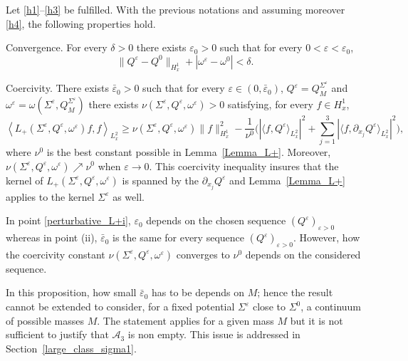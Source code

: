 \begin{proposition}\label{perturbative_L+}
Let \eqref{h1}--\eqref{h3} be fulfilled. With the previous notations and assuming moreover \eqref{h4}, the following properties hold.
\begin{enumeratei}
\item\label{perturbative_L+i}
\textup{Convergence.} For every $\delta>0$ there exists $\varepsilon_{0}>0$ such that for every $0<\varepsilon<\varepsilon_{0}$,
\[
\|Q^{\varepsilon}-Q^{0}\|_{H_{x}^{1}}+|\omega^{\varepsilon}-\omega^{0}|<\delta.
\]
\item\label{perturbative_L+ii}
\textup{Coercivity.} There exists $\bar{\varepsilon}_0>0$ such that for every $\varepsilon\in(0,\bar{\varepsilon}_{0})$, $Q^{\varepsilon}=Q_{M}^{\Sigma^{\varepsilon}}$ and $\omega^{\varepsilon}=\omega(\Sigma^{\varepsilon},Q_{M}^{\Sigma^{\varepsilon}})$ there exists $\nu(\Sigma^{\varepsilon},Q^{\varepsilon},\omega^{\varepsilon})>0$ satisfying, for every $f\in H_{x}^{1}$,
\[
\left\langle L_{+}(\Sigma^{\varepsilon},Q^{\varepsilon},\omega^{\varepsilon})f,f\right\rangle_{L_{x}^{2}}\!\geq\!
\nu(\Sigma^{\varepsilon},Q^{\varepsilon},\omega^{\varepsilon})\|f\|_{H_{x}^{1}}^{2}-\frac{1}{\nu^{0}}\biggl(\!\left|\langle f,Q^{\varepsilon}\rangle_{L_{x}^{2}}\right|^{2}+\sum_{j=1}^{3}\left|\langle f,\partial_{x_{j}}Q^{\varepsilon}\rangle_{L_{x}^{2}}\right|^{2}\!\biggr),
\]
where $\nu^{0}$ is the best constant possible in Lemma~\ref{Lemma_L+}. Moreover, $\nu(\Sigma^{\varepsilon},Q^{\varepsilon},\omega^{\varepsilon})\nearrow\nu^{0}$ when $\varepsilon\to 0$. This coercivity inequality insures that the kernel of $L_{+}(\Sigma^{\varepsilon},Q^{\varepsilon},\omega^{\varepsilon})$ is spanned by the $\partial_{x_{j}}Q^{\varepsilon}$ and Lemma~\ref{Lemma_L+} applies to the kernel $\Sigma^\varepsilon$ as well.
\end{enumeratei}
\end{proposition}

\begin{rmk}
In point \eqref{perturbative_L+i}, $\varepsilon_{0}$ depends on the chosen sequence $(Q^{\varepsilon})_{\varepsilon>0}$ whereas in point (ii), $\bar{\varepsilon}_{0}$ is the same for every sequence $(Q^{\varepsilon})_{\varepsilon>0}$. However, how the coercivity constant $\nu(\Sigma^{\varepsilon},Q^{\varepsilon},\omega^{\varepsilon})$ converges to $\nu^{0}$ depends on the considered sequence.
\end{rmk}

In this proposition, how small $\bar{\varepsilon}_{0}$ has to be depends on $M$; hence the result cannot be extended to consider, for a fixed potential $\Sigma^{\varepsilon}$ close to $\Sigma^{0}$, a continuum of possible masses $M$.
The statement applies for a given mass $M$ but it is not sufficient to justify that $\mathscr A_{3}$ is non empty. This issue is addressed in Section~\ref{large_class_sigma1}.

